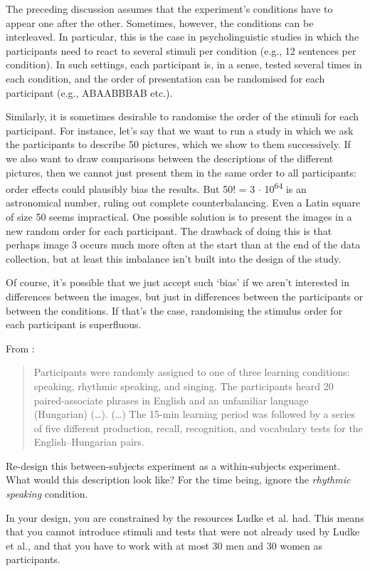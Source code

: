 The preceding discussion assumes that the experiment's conditions
have to appear one after the other.
Sometimes, however, the conditions can be interleaved.
In particular, this is the case in psycholinguistic studies in which
the participants need to react to several stimuli per condition
(e.g., 12 sentences per condition).
In such settings, each participant is, in a sense, tested several times
in each condition, and the order of presentation can be randomised
for each participant (e.g., ABAABBBAB etc.).

Similarly, it is sometimes desirable to randomise the order of the stimuli
for each participant.
For instance, let's say that we want to run a study
in which we ask the participants to describe 50 pictures,
which we show to them successively. 
If we also want to draw comparisons between the descriptions 
of the different pictures, 
then we cannot just present them in the same order to all participants: 
order effects could plausibly
bias the results.
But 50! = 3 $\cdot$ 10\textsuperscript{64} is an astronomical number, ruling out
complete counterbalancing.
Even a Latin square of size 50 seems impractical.
One possible solution is to present the images in a new random order for each
participant.
The drawback of doing this is that perhaps image 3 occurs 
much more often at the start than at the end of the data collection,
but at least this imbalance isn't built into the design of the study.

Of course, it's possible that we just accept such `bias' if we aren't interested
in differences between the images, but just in differences between
the participants or between the conditions. 
If that's the case, randomising the stimulus order for each participant is superfluous.

From \citet{Ludke2014}:
 \begin{quote}
Participants were randomly assigned to one of three learning conditions:
speaking, rhythmic speaking, and singing. The participants heard 20 paired-associate
phrases in English and an unfamiliar language (Hungarian) (\dots).
(\dots) The 15-min learning period was followed by a series of five different production,
recall, recognition, and vocabulary tests for the English--Hungarian pairs.
\end{quote}
Re-design this between-subjects experiment as a within-subjects experiment.
What would this description look like? For the time being, ignore the \textit{rhythmic speaking} condition.

In your design, you are constrained by the resources Ludke et al. had. This means that
you cannot introduce stimuli and tests that were not already used by Ludke et al., and
that you have to work with at most 30 men and 30 women as participants.
\parend

